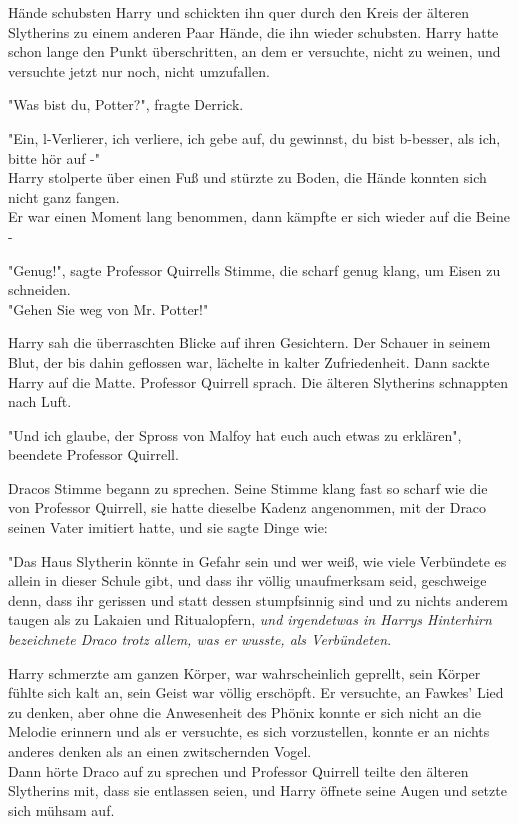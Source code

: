 {Hände schubsten Harry und schickten ihn quer durch den Kreis der älteren Slytherins zu einem anderen Paar Hände, die ihn wieder schubsten. Harry hatte schon lange den Punkt überschritten, an dem er versuchte, nicht zu weinen, und versuchte jetzt nur noch, nicht umzufallen.

"Was bist du, Potter?", fragte Derrick.

"Ein, l-Verlierer, ich verliere, ich gebe auf, du gewinnst, du bist b-besser, als ich, bitte hör auf -"\\ Harry stolperte über einen Fuß und stürzte zu Boden, die Hände konnten sich nicht ganz fangen.\\ Er war einen Moment lang benommen, dann kämpfte er sich wieder auf die Beine -

"Genug!", sagte Professor Quirrells Stimme, die scharf genug klang, um Eisen zu schneiden.\\ "Gehen Sie weg von Mr. Potter!"

Harry sah die überraschten Blicke auf ihren Gesichtern. Der Schauer in seinem Blut, der bis dahin geflossen war, lächelte in kalter Zufriedenheit. Dann sackte Harry auf die Matte. Professor Quirrell sprach. Die älteren Slytherins schnappten nach Luft.

"Und ich glaube, der Spross von Malfoy hat euch auch etwas zu erklären", beendete Professor Quirrell.

Dracos Stimme begann zu sprechen. Seine Stimme klang fast so scharf wie die von Professor Quirrell, sie hatte dieselbe Kadenz angenommen, mit der Draco seinen Vater imitiert hatte, und sie sagte Dinge wie:

"Das Haus Slytherin könnte in Gefahr sein und wer weiß, wie viele Verbündete es allein in dieser Schule gibt, und dass ihr völlig unaufmerksam seid, geschweige denn, dass ihr gerissen und statt dessen stumpfsinnig sind und zu nichts anderem taugen als zu Lakaien und Ritualopfern, \emph{und irgendetwas in Harrys Hinterhirn bezeichnete Draco trotz allem, was er wusste, als Verbündeten}.

Harry schmerzte am ganzen Körper, war wahrscheinlich geprellt, sein Körper fühlte sich kalt an, sein Geist war völlig erschöpft. Er versuchte, an Fawkes' Lied zu denken, aber ohne die Anwesenheit des Phönix konnte er sich nicht an die Melodie erinnern und als er versuchte, es sich vorzustellen, konnte er an nichts anderes denken als an einen zwitschernden Vogel.\\ Dann hörte Draco auf zu sprechen und Professor Quirrell teilte den älteren Slytherins mit, dass sie entlassen seien, und Harry öffnete seine Augen und setzte sich mühsam auf.

}

